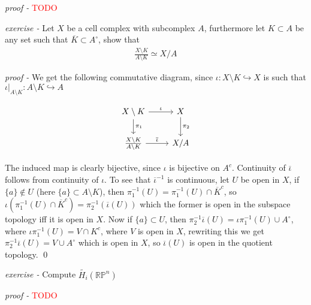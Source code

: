 \documentclass[11pt]{article}
\theoremstyle{definition}
\newcommand{\set}[1]{\{#1\}}
\begin{document}
    \emph{proof - }\textcolor{red}{TODO}


    \emph{exercise - }\label{HEx16} Let \(X\) be a cell complex with subcomplex \(A\), furthermore let \(K \subset A\) be any set such that \(\overline{K} \subset A^\circ\), show that
    \begin{align*}
        \frac{X \setminus K}{A \setminus K} \simeq X/A
    \end{align*}

    \emph{proof - } We get the following commutative diagram, since \(\iota: X \setminus K \hookrightarrow X\) is such that \(\iota \vert_{A \setminus K} : A \setminus K \hookrightarrow A\)

    \begin{equation*}
        \begin{tikzcd}
            X \setminus K \arrow[r,"{\iota}"] \arrow[d,"{\pi_1}"] & X \arrow[d,"{\pi_2}"] \\
            \frac{X \setminus K}{A \setminus K} \arrow[r,"{\overline{\iota}}"] & X/A
        \end{tikzcd}
    \end{equation*}

    The induced map is clearly bijective, since \(\iota\) is bijective on \(A^c\). Continuity of \(\overline{\iota}\) follows from continuity of \(\iota\). To see that \(\overline{\iota}^{-1}\) is continuous, let \(U\) be open  in \(X\), if \(\set{a} \not \in U\) (here \(\set{a} \subset A \setminus K\)), then \(\pi_1^{-1}(U) = \pi_1^{-1}(U) \cap \overline{K}^c\), so \(\iota(\pi_1^{-1}(U) \cap \overline{K}^c) = \pi_2^{-1}(\overline{\iota}(U))\) which the former is open in the subspace topology iff it is open in \(X\). Now if \(\set{a} \subset U\), then \(\pi_2^{-1}\overline{\iota}(U) = \iota\pi_1^{-1}(U) \cup A^\circ\), where \(\iota\pi_1^{-1}(U) = V \cap K^c\), where \(V\) is open in \(X\), rewriting this we get \(\pi_2^{-1}\overline{\iota}(U) = V \cup A^\circ\) which is open in \(X\), so \(\overline{\iota}(U)\) is open in the quotient topology. \qed



    \emph{exercise - }\label{HEx17} Compute \(\tilde{H_i}(\mathbb{RP}^n)\)

    \emph{proof - }\textcolor{red}{TODO}
\end{document}
